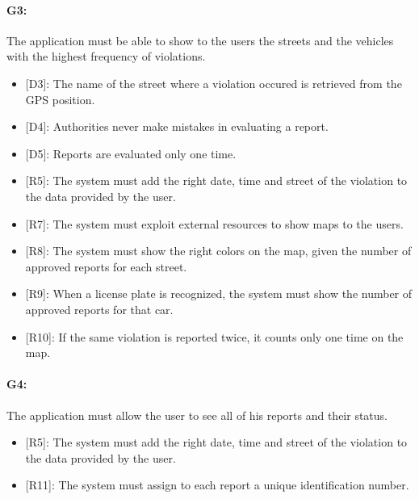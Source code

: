 \documentclass[12pt,a4paper]{report}
\begin{document}
			\paragraph {G3:} The application must be able to show to the users the streets and the vehicles with the highest frequency of violations.
			\begin{itemize}
				\item{[D3]:} The name of the street where a violation occured is retrieved from the GPS position.
				\item{[D4]:} Authorities never make mistakes in evaluating a report.
				\item{[D5]:} Reports are evaluated only one time.
			\end{itemize}
			\begin{itemize}
				\item{[R5]:} The system must add the right date, time and street of the violation to the data provided by the user.
				\item{[R7]:} The system must exploit external resources to show maps to the users.
				\item{[R8]:} The system must show the right colors on the map, given the number of approved reports for each street.
				\item{[R9]:} When a license plate is recognized, the system must show the number of approved reports for that car.
				\item{[R10]:} If the same violation is reported twice, it counts only one time on the map.
			\end{itemize}
				\paragraph {G4:}  The application must allow the user to see all of his reports and their status.
			\begin{itemize}
				\item{[R5]:} The system must add the right date, time and street of the violation to the data provided by the user.
				\item{[R11]:} The system must assign to each report a unique identification number.
			\end{itemize}
\end{document}
